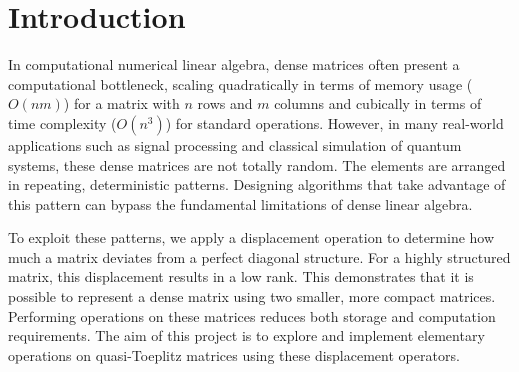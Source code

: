 \section{Introduction}

In computational numerical linear algebra,
dense matrices often present a computational bottleneck,
scaling quadratically in terms of memory usage ($O(nm)$) for a matrix
with $n$ rows and $m$ columns
and cubically in terms of time complexity ($O(n^3)$) for standard operations.
However, in many real-world applications such as signal
processing\cite{7400965}\cite{signals5030021}
and classical simulation of quantum
systems\cite{10.1098/rsos.160906}, these dense matrices are not totally random.
The elements are arranged in repeating, deterministic patterns.
Designing algorithms that take advantage of this pattern can bypass
the fundamental
limitations of dense linear algebra.

To exploit these patterns, we apply a displacement operation to
determine how much a matrix deviates from a perfect diagonal structure.
For a highly structured matrix, this displacement results in a low rank.
This demonstrates that it is possible to represent a dense matrix
using two smaller, more compact matrices.
Performing operations on these matrices reduces both storage and
computation requirements.
The aim of this project is to explore and implement elementary
operations on quasi-Toeplitz matrices using these displacement operators.
